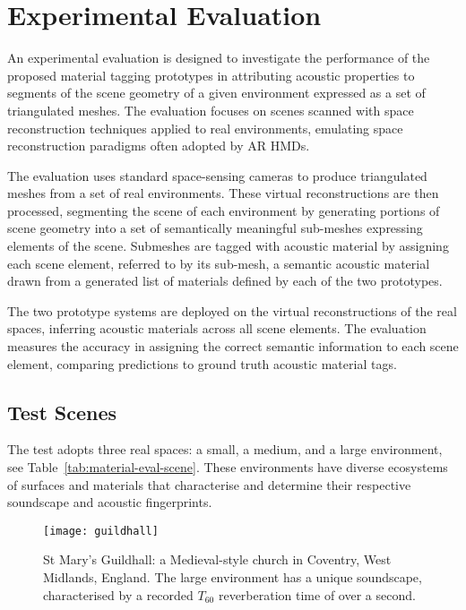 \section{Experimental Evaluation}
An experimental evaluation is designed to investigate the performance of the proposed material tagging prototypes in attributing acoustic properties to segments of the scene geometry of a given environment expressed as a set of triangulated meshes. The evaluation focuses on scenes scanned with space reconstruction techniques applied to real environments, emulating space reconstruction paradigms often adopted by AR HMDs. \par
The evaluation uses standard space-sensing cameras to produce triangulated meshes from a set of real environments. These virtual reconstructions are then processed, segmenting the scene of each environment by generating portions of scene geometry into a set of semantically meaningful sub-meshes expressing elements of the scene. Submeshes are tagged with acoustic material by assigning each scene element, referred to by its sub-mesh, a semantic acoustic material drawn from a generated list of materials defined by each of the two prototypes. \par
The two prototype systems are deployed on the virtual reconstructions of the real spaces, inferring acoustic materials across all scene elements. The evaluation measures the accuracy in assigning the correct semantic information to each scene element, comparing predictions to ground truth acoustic material tags.

\subsection{Test Scenes}
The test adopts three real spaces: a small, a medium, and a large environment, see Table~\ref{tab:material-eval-scene}. These environments have diverse ecosystems of surfaces and materials that characterise and determine their respective soundscape and acoustic fingerprints.

\begin{figure}[htbp]
    \centering
    \texttt{[image: guildhall]}
    \caption{St Mary's Guildhall: a Medieval-style church in Coventry, West Midlands, England. The large environment has a unique soundscape, characterised by a recorded $T_{60}$ reverberation time of over a second.}
    \label{fig:guildhall-iso-render}
\end{figure}

